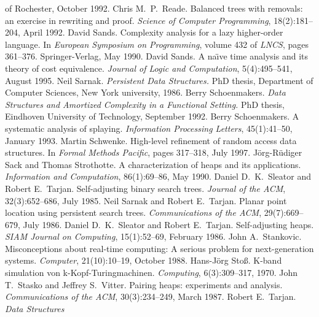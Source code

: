 \begin{thebibliography}{XXXXXXX}
  of Rochester, October 1992.
 Chris M.~P.~Reade. Balanced trees with
  removals: an exercise in rewriting and proof. \textit{Science of
    Computer Programming}, 18(2):181--204, April 1992.
 David Sands. Complexity analysis for a lazy
  higher-order language. In \textit{European Symposium on
    Programming}, volume 432 of \textit{LNCS}, pages
  361--376. Springer-Verlag, May 1990.
 David Sands. A na\"\i{}ve time analysis and
  its theory of cost equivalence. \textit{Journal of Logic and
    Computation}, 5(4):495--541, August 1995.
 Neil Sarnak. \textit{Persistent Data
    Structures.}\/ PhD thesis, Department of Computer Sciences, New
  York university, 1986.
 Berry Schoenmakers. \textit{Data
    Structures and Amortized Complexity in a Functional Setting.}\/
  PhD thesis, Eindhoven University of Technology, September 1992.
 Berry Schoenmakers. A systematic
  analysis of splaying. \textit{Information Processing Letters},
  45(1):41--50, January 1993.
 Martin Schwenke. High-level refinement
  of random access data structures. In \textit{Formal Methods
    Pacific}, pages 317--318, July 1997.
 J\"org-R\"udiger Sack and Thomas
  Strothotte. A characterization of heaps and its
  applications. \textit{Information and Computation}, 86(1):69--86,
  May 1990.
 Daniel D.~K.~Sleator and Robert
  E.~Tarjan. Self-adjusting binary search trees. \textit{Journal of
    the ACM}, 32(3):652--686, July 1985.
 Neil Sarnak and Robert
  E.~Tarjan. Planar point location using persistent search
  trees. \textit{Communications of the ACM}, 29(7):669--679, July 1986.
 Daniel D.~K.~Sleator and Robert E.~Tarjan.
  Self-adjusting heaps. \textit{SIAM Journal on Computing},
  15(1):52--69, February 1986.
 John A.~Stankovic. Misconceptions about
  real-time computing: A serious problem for next-generation
  systems. \textit{Computer}, 21(10):10--19, October 1988.
 Hans-J\"org Sto\ss{}. K-band simulation von
  k-Kopf-Turing\-machinen. \textit{Computing}, 6(3):309--317, 1970.
 John T.~Stasko and Jeffrey
  S.~Vitter. Pairing heaps: experiments and
  analysis. \textit{Communications of the ACM}, 30(3):234--249, March 1987.
 Robert E.~Tarjan. \textit{Data Structures
}
\end{thebibliography}

